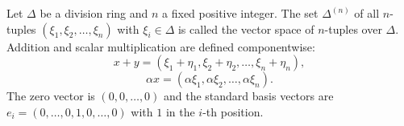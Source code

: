 Let $\Delta$ be a division ring and $n$ a fixed positive integer. The set $\Delta^{(n)}$ of all $n$-tuples $(\xi_1, \xi_2, \ldots, \xi_n)$ with $\xi_i \in \Delta$ is called the vector space of $n$-tuples over $\Delta$. Addition and scalar multiplication are defined componentwise:
$$x + y = (\xi_1 + \eta_1, \xi_2 + \eta_2, \ldots, \xi_n + \eta_n),$$
$$\alpha x = (\alpha \xi_1, \alpha \xi_2, \ldots, \alpha \xi_n).$$
The zero vector is $(0, 0, \ldots, 0)$ and the standard basis vectors are $e_i = (0, \ldots, 0, 1, 0, \ldots, 0)$ with $1$ in the $i$-th position.
